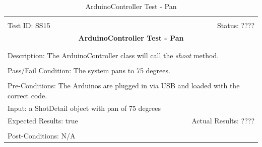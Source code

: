 \documentclass[11pt]{article}
\begin{document}
\begin{center}
\begin{table}[H]
\begin{tabular}{|l r|}\hline&\\[-2mm]
	Test ID: SS15	&Status: ????\\[-3mm]
	\multicolumn{2}{|c|}{\textbf{\large{ArduinoController Test - Pan}}}\\&\\\hline&\\[-3mm]
	\multicolumn{2}{|p{\textwidth}|}{Description: The ArduinoController class will call the \textit{shoot} method.}\\[1mm]\hline&\\[-3mm]
	\multicolumn{2}{|p{\textwidth}|}{Pass/Fail Condition: The system pans to 75 degrees.}\\[1mm]\hline&\\[-3mm]
	\multicolumn{2}{|p{\textwidth}|}{Pre-Conditions: The Arduinos are plugged in via USB and loaded with the correct code.}\\[4mm]
	\multicolumn{2}{|p{\textwidth}|}{Input: a ShotDetail object with pan of 75 degrees}\\[2mm]\hline
	\multicolumn{1}{|p{0.49\textwidth}}{Expected Results: true}	&\multicolumn{1}{|p{0.45\textwidth}|}{Actual Results: ????}\\\hline&\\[-3mm]
	\multicolumn{2}{|p{\textwidth}|}{Post-Conditions: N/A}\\\hline
\end{tabular}
\caption{ArduinoController Test - Pan}
\end{table}
\end{center}
\end{document}
